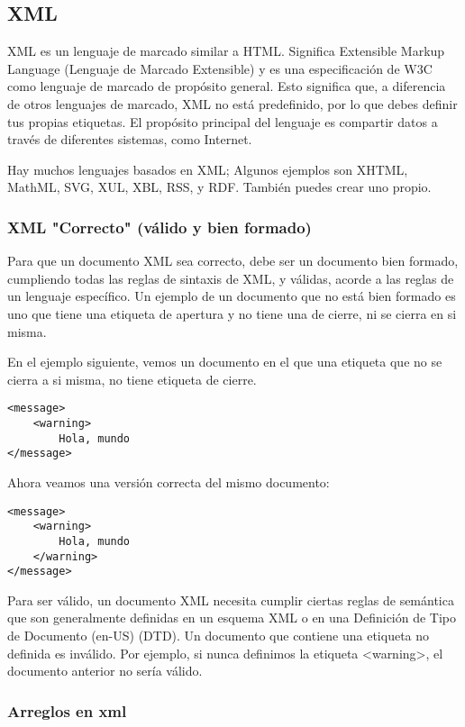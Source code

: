 \begin{enumerate}
\subsection{XML}

\cite{mdn} XML es un lenguaje de marcado similar a HTML. Significa Extensible Markup Language (Lenguaje de Marcado Extensible) y es una especificación de W3C como lenguaje de marcado de propósito general. Esto significa que, a diferencia de otros lenguajes de marcado, XML no está predefinido, por lo que debes definir tus propias etiquetas. El propósito principal del lenguaje es compartir datos a través de diferentes sistemas, como Internet.

Hay muchos lenguajes basados en XML; Algunos ejemplos son XHTML, MathML, SVG, XUL, XBL, RSS, y RDF. También puedes crear uno propio.

\subsubsection{XML "Correcto" (válido y bien formado)}

Para que un documento XML sea correcto, debe ser un documento bien formado, cumpliendo todas las reglas de sintaxis de XML, y válidas, acorde a las reglas de un lenguaje específico. Un ejemplo de un documento que no está bien formado es uno que tiene una etiqueta de apertura y no tiene una de cierre, ni se cierra en si misma.

En el ejemplo siguiente, vemos un documento en el que una etiqueta que no se cierra a si misma, no tiene etiqueta de cierre.

\begin{lstlisting}
<message>
	<warning>
		Hola, mundo
</message>
\end{lstlisting}

Ahora veamos una versión correcta del mismo documento:

\begin{lstlisting}
<message>
	<warning>
		Hola, mundo
	</warning>
</message>
\end{lstlisting}

Para ser válido, un documento XML necesita cumplir ciertas reglas de semántica que son generalmente definidas en un esquema XML o en una Definición de Tipo de Documento (en-US) (DTD). Un documento que contiene una etiqueta no definida es inválido. Por ejemplo, si nunca definimos la etiqueta <warning>, el documento anterior no sería válido.

\subsubsection{Arreglos en xml}


\end{enumerate}
